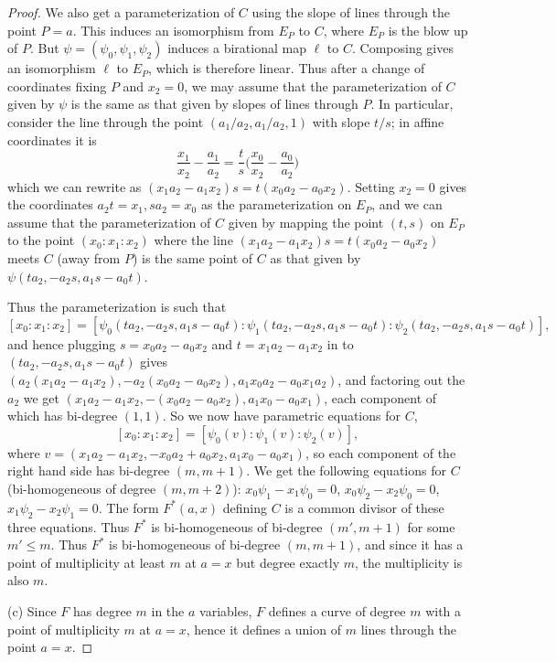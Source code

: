 \documentclass[12pt]{amsart}
\numberwithin{equation}{section}
\theoremstyle{definition}
\begin{document}
\begin{proof}
We also get a parameterization of $C$ using the slope of lines through the point $P=a$. This induces an isomorphism
from $E_P$ to $C$, where $E_P$ is the blow up of $P$. But $\psi=(\psi_0,\psi_1,\psi_2)$ induces a birational map
$\ell$ to $C$. Composing gives an isomorphism $\ell$ to $E_P$, which is therefore linear.
Thus after a change of coordinates fixing $P$ and $x_2=0$, we may assume that
the parameterization of $C$ given by $\psi$ is the same as that given by slopes of lines
through $P$. In particular, consider the line through the point $(a_1/a_2,a_1/a_2,1)$ with slope $t/s$; in affine coordinates it is
$$\frac{x_1}{x_2}-\frac{a_1}{a_2}=\frac{t}{s}\Big(\frac{x_0}{x_2}-\frac{a_0}{a_2}\Big)$$
which we can rewrite as $(x_1a_2-a_1x_2)s=t(x_0a_2-a_0x_2)$. Setting $x_2=0$ gives the coordinates
$a_2t=x_1, sa_2=x_0$ as the parameterization on $E_P$, and we can assume that the parameterization
of $C$ given by mapping the point $(t,s)$ on $E_P$ to the point $(x_0:x_1:x_2)$ where the 
line $(x_1a_2-a_1x_2)s=t(x_0a_2-a_0x_2)$ meets $C$ (away from $P$) is the same point of $C$ as that given by
$\psi(ta_2,-a_2s,a_1s-a_0t)$. 

Thus the parameterization is such that 
$$[x_0:x_1:x_2]=[\psi_0(ta_2,-a_2s,a_1s-a_0t):\psi_1(ta_2,-a_2s,a_1s-a_0t):\psi_2(ta_2,-a_2s,a_1s-a_0t)],$$ 
and hence plugging $s=x_0a_2-a_0x_2$ and $t=x_1a_2-a_1x_2$ 
in to $(ta_2,-a_2s,a_1s-a_0t)$ gives $(a_2(x_1a_2-a_1x_2),-a_2(x_0a_2-a_0x_2),a_1x_0a_2-a_0x_1a_2)$, and factoring out the $a_2$ we get
$(x_1a_2-a_1x_2,-(x_0a_2-a_0x_2),a_1x_0-a_0x_1)$, each component of which has bi-degree $(1,1)$.
So we now have parametric equations for $C$,
$$[x_0:x_1:x_2]=[\psi_0(v):\psi_1(v):\psi_2(v)],$$
where $v=(x_1a_2-a_1x_2,-x_0a_2+a_0x_2,a_1x_0-a_0x_1)$, so each component of the right hand side has bi-degree $(m,m+1)$.
We get the following equations for $C$ (bi-homogeneous of degree $(m,m+2)$):
$x_0\psi_1-x_1\psi_0=0$, $x_0\psi_2-x_2\psi_0=0$, $x_1\psi_2-x_2\psi_1=0$.
The form $F^*(a,x)$ defining $C$ is a common divisor of these three equations. Thus 
$F^*$ is bi-homogeneous of bi-degree $(m',m+1)$
for some $m'\leq m$. Thus $F^*$ is bi-homogeneous of bi-degree $(m,m+1)$,
and since it has a point of multiplicity at least $m$ at $a=x$ but degree exactly $m$,
the multiplicity is also $m$.

(c) Since $F$ has degree $m$ in the $a$ variables, $F$ defines a curve
of degree $m$ with a point of multiplicity $m$ at $a=x$, hence it defines a union of $m$ lines through the
point $a=x$. 


\end{proof}
\end{document}
